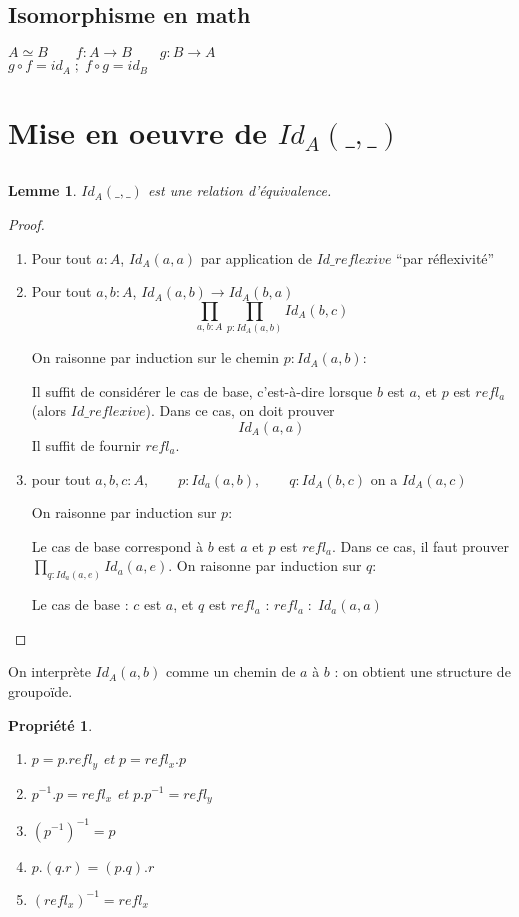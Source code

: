 \documentclass{article}
\newtheorem{prop}{Propriété}
\newtheorem{lemma}{Lemme}
\begin{document}
\subsection*{Isomorphisme en math}
$A \simeq B \qquad f: A \to B \qquad g : B \to A$\\
$g \circ f = id_A \;;\; f\circ g = id_B$

\section{Mise en oeuvre de $Id_A(\_,\_)$}
\subsection{}
\begin{lemma}
$Id_A(\_,\_)$ est une relation d'équivalence.
\end{lemma}

\begin{proof}
\begin{enumerate}[label=\roman*)]
\item Pour tout $a : A$, $Id_A(a,a)$ par application de $Id\_reflexive$ ``par réflexivité''
\item Pour tout $a,b : A$, $Id_A(a,b)\to Id_A(b,a)$
\[ \prod_{a,b : A}\prod_{p:Id_A (a,b)} Id_A(b,c)\]

On raisonne par induction sur le chemin $p:Id_A(a,b)$:

Il suffit de considérer le cas de base, c'est-à-dire lorsque $b$ est $a$, et $p$ est $refl_a$ (alors $Id\_reflexive$). Dans ce cas, on doit prouver 
\[Id_A(a,a)\]
Il suffit de fournir $refl_a$.
\item pour tout $a,b,c : A,\qquad p:Id_a(a,b),\qquad q:Id_A(b,c)$ on a $Id_A(a,c)$

On raisonne par induction sur $p$:

Le cas de base correspond à $b$ est $a$ et $p$ est $refl_a$. Dans ce cas, il faut prouver $\prod_{q:Id_a(a,e)} Id_a (a,e)$. On raisonne par induction sur $q$:

Le cas de base : $c$ est $a$, et $q$ est $refl_a$ : $refl_a\; : \; Id_a(a,a)$
\end{enumerate}
\end{proof}

On interprète $Id_A(a,b)$ comme un chemin de $a$ à $b$ : on obtient une structure de groupoïde.

\begin{prop}
\begin{enumerate}[label=\roman*)]
\item $p=p.refl_y$ et $p=refl_x.p$
\item $p^{-1}.p=refl_x$ et $p.p^{-1}=refl_y$
\item $(p^{-1})^{-1}=p$
\item $p.(q.r)=(p.q).r$
\item $(refl_x)^{-1} = refl_x$
\end{enumerate}
\end{prop}
\end{document}
